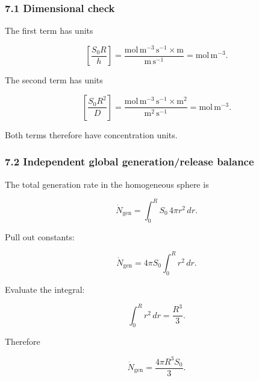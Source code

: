 \documentclass[11pt,a4paper]{article}
\begin{document}
\subsubsection*{7.1 Dimensional check}

The first term has units

\begin{equation}
\left[
\frac{S_0R}{h}
\right]
=
\frac{
\mathrm{mol\,m^{-3}\,s^{-1}}
\times
\mathrm m
}{
\mathrm{m\,s^{-1}}
}
=
\mathrm{mol\,m^{-3}}.
\tag{TRISO-ANA-130}
\label{eq:triso-ana-130}
\end{equation}

The second term has units

\begin{equation}
\left[
\frac{S_0R^2}{D}
\right]
=
\frac{
\mathrm{mol\,m^{-3}\,s^{-1}}
\times
\mathrm{m^2}
}{
\mathrm{m^2\,s^{-1}}
}
=
\mathrm{mol\,m^{-3}}.
\tag{TRISO-ANA-131}
\label{eq:triso-ana-131}
\end{equation}

Both terms therefore have concentration units.

\subsubsection*{7.2 Independent global generation/release balance}

The total generation rate in the homogeneous sphere is

\begin{equation}
\dot N_{\mathrm{gen}}
=
\int_0^R
S_0\,4\pi r^2\,dr.
\tag{TRISO-ANA-132}
\label{eq:triso-ana-132}
\end{equation}

Pull out constants:

\begin{equation}
\dot N_{\mathrm{gen}}
=
4\pi S_0
\int_0^Rr^2\,dr.
\tag{TRISO-ANA-133}
\label{eq:triso-ana-133}
\end{equation}

Evaluate the integral:

\begin{equation}
\int_0^Rr^2\,dr
=
\frac{R^3}{3}.
\tag{TRISO-ANA-134}
\label{eq:triso-ana-134}
\end{equation}

Therefore

\begin{equation}
\boxed{
\dot N_{\mathrm{gen}}
=
\frac{4\pi R^3S_0}{3}.
}
\tag{TRISO-ANA-135}
\label{eq:triso-ana-135}
\end{equation}
\end{document}
